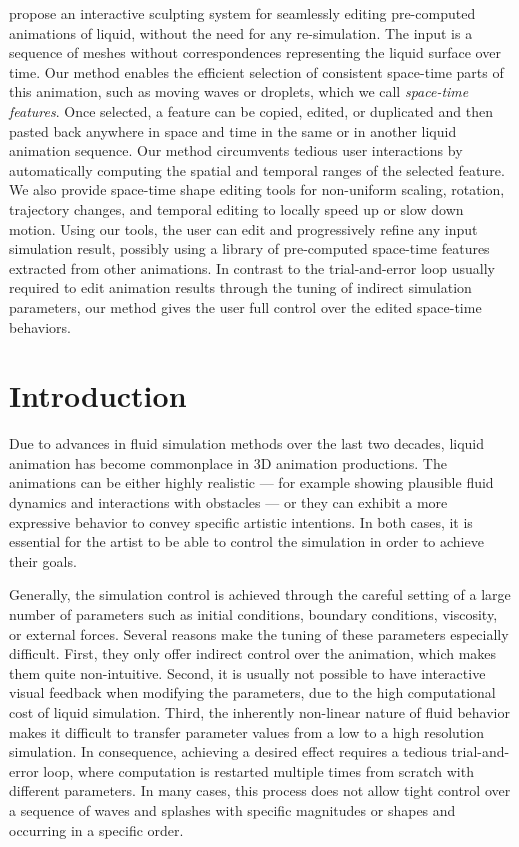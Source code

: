  propose an interactive sculpting system for seamlessly editing pre-computed animations of liquid, without the need for any re-simulation. 
The input is a sequence of meshes without correspondences representing the liquid surface over time. 
Our method enables the efficient selection of consistent space-time parts of this animation, such as moving waves or droplets, which we call {\em space-time features}. 
Once selected, a feature can be copied, edited, or duplicated and then pasted back anywhere in space and time in the same or in another liquid animation sequence. 
Our method circumvents tedious user interactions by automatically computing the spatial and temporal ranges of the selected feature. 
We also provide space-time shape editing tools for non-uniform scaling, rotation, trajectory changes, and temporal editing to locally speed up or slow down motion.
Using our tools, the user can edit and progressively refine any input simulation result, possibly using a library of pre-computed space-time features extracted from other animations. 
In contrast to the trial-and-error loop usually required to edit animation results through the tuning of indirect simulation parameters, our method gives the user full control over the edited space-time behaviors. 

\section{Introduction} \label{sec:fluidsculpting:introduction}

Due to advances in fluid simulation methods over the last two decades, liquid animation has become commonplace in 3D animation productions. 
The animations can be either highly realistic --- for example showing plausible fluid dynamics and interactions with obstacles --- or they can exhibit a more expressive behavior to convey specific artistic intentions. In both cases, it is essential for the artist to be able to control the simulation in order to achieve their goals.

Generally, the simulation control is achieved through the careful setting of a large number of parameters such as initial conditions, boundary conditions, viscosity, or external forces. 
Several reasons make the tuning of these parameters especially difficult. 
First, they only offer indirect control over the animation, which makes them quite non-intuitive. 
Second, it is usually not possible to have interactive visual feedback when modifying the parameters, due to the high computational cost of 
liquid simulation.
Third, the inherently non-linear nature of fluid behavior makes it difficult to transfer parameter values from a low to a high resolution simulation. 
In consequence, achieving a desired effect requires a tedious trial-and-error loop, where computation is restarted multiple times from scratch with different parameters. 
In many cases, this process does not allow tight control over a sequence of waves and splashes with specific magnitudes or shapes and occurring in a specific order. 

